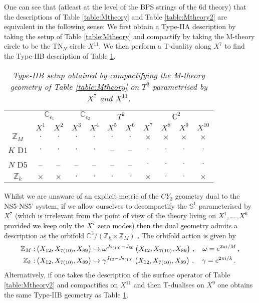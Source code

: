 \documentclass[main.tex]{subfiles}
\begin{document}
One can see that (atleast at the level of the BPS strings of the 6d theory) that the descriptions of Table \ref{table:Mtheory} and Table \ref{table:Mtheory2} are equivalent in the following sense: 
We first obtain a Type-IIA description by taking the setup of Table \ref{table:Mtheory} and compactify by taking the M-theory circle to be the TN$_{N}$ circle $X^{11}$. 
We then perform a T-duality along $X^7$ to find the Type-IIB description of Table \ref{table:IIB}. 
\begin{table}[ht!]
\centering
\begin{tabular}{ c |c| c| c| c| c| c| c| c| c| c| }
&\multicolumn{2}{c|}{$\mathbb{C}_{\epsilon_1}$}&\multicolumn{2}{c|}{$\mathbb{C}_{\epsilon_2}$}&\multicolumn{2}{c|}{$T^2$}&\multicolumn{4}{c|}{$\mathbb{C}^2$}\\
   & $X^1$ & $X^2$ & $X^3$ & $X^4$ & $X^5$ & $X^6$ & $X^7$ & $X^8$ & $X^9$& $X^{10}$\\\hline 
  $\mathbb{Z}_M$ & $\cdot$ & $\cdot$ & $\cdot$ & $\cdot$ & $\cdot$ & $\cdot$ & $\times$ & $\times$ & $\times$ & $\times$\\ \hline
  $K$ D$1$ & $\cdot$ & $\cdot$ & $\cdot$ & $\cdot$ & -- & -- & $\cdot$ & $\cdot$ & $\cdot$ & $\cdot$ \\\hline
 $N$ D$5$ & --& -- & -- & -- & -- & -- & $\cdot$ &$\cdot$ & $\cdot$ & $\cdot$\\ \hline
 $\mathbb{Z}_k$ & $\times$ & $\times$ & $\cdot$ & $\cdot$ & $\cdot$ & $\cdot$ & $\times$ & $\cdot$& $\cdot$ &$\times$ \\\hline
\end{tabular}
\caption{\it Type-IIB setup obtained by compactifying the M-theory geometry of Table \ref{table:Mtheory} on $T^2$ parametrised by $X^7$ and $X^{11}$.}
\label{table:IIB}
\end{table}
Whilst we are unaware of an explicit metric of the $CY_3$ geometry dual to the NS5-NS5' system, if we allow ourselves to decompactify the $\mathbb{S}^1$ parameterised by $X^7$ (which is irrelevant from the point of view of the theory living on $X^1,\dots,X^6$ provided we keep only the $X^7$ zero modes) then the dual geometry admits a description as the orbifold $\mathbb{C}^3/(\mathbb{Z}_k\times\mathbb{Z}_M)$ \cite{Hanany:1998it}. The orbifold action is given by
\begin{equation}
\begin{aligned}\label{eqn:orbaction}
\mathbb{Z}_M:&\left(X_{12},X_{7(10)},X_{89}\right)\mapsto\omega^{J_{7(10)}-J_{89}}\left(X_{12},X_{7(10)},X_{89}\right)\,,\quad  \omega=e^{2\pi\mathrm{i}/M}\,,\\
\mathbb{Z}_k:&\left(X_{12},X_{7(10)},X_{89}\right)\mapsto\gamma^{J_{12}-J_{7(10)}} \left(X_{12},X_{7(10)},X_{89}\right)\,,\quad \gamma=e^{2\pi\mathrm{i}/k}\,.
\end{aligned}
\end{equation}
Alternatively, if one takes the description of the surface operator of Table \ref{table:Mtheory2} and compactifies on $X^{11}$ and then T-dualises on $X^9$ one obtains the same Type-IIB geometry as Table \ref{table:IIB}.
\end{document}
